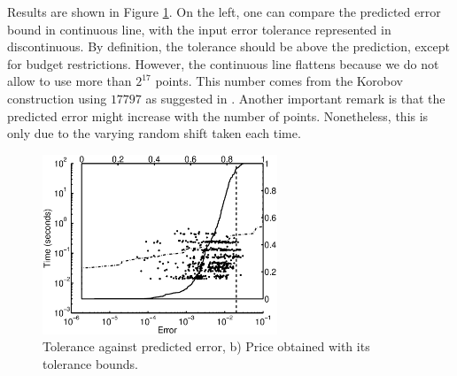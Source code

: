 \documentclass[graybox]{svmult}
\begin{document}
Results are shown in Figure \ref{geoAsianmean}. On the left, one can compare the predicted error bound in continuous line, with the input error tolerance represented in discontinuous. By definition, the tolerance should be above the prediction, except for budget restrictions. However, the continuous line flattens because we do not allow to use more than $2^{17}$ points. This number comes from the Korobov construction using $17797$ as suggested in \cite{HicEtal00}. Another important remark is that the predicted error might increase with the number of points. Nonetheless, this is only due to the varying random shift taken each time.

\begin{figure}[h!]
\centering
\includegraphics[width=7cm]{Images/geomeancubLatticeErrTime_d_64.eps} 
\caption{Tolerance against predicted error, b) Price obtained with its tolerance bounds. \label{geoAsianmean}}
\end{figure}
\end{document}
